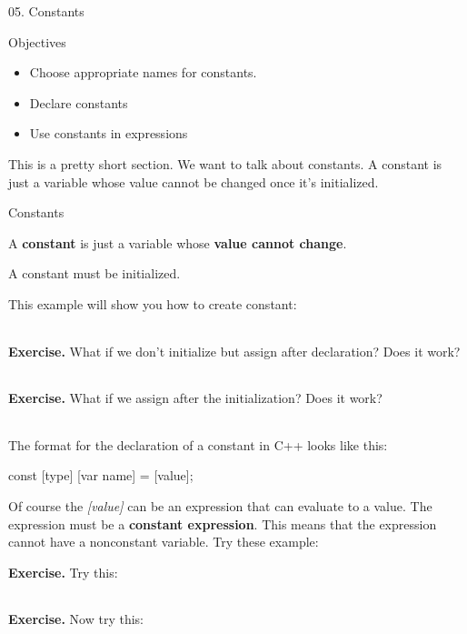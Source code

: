 \documentclass[
]{article}
\author{}
\date{}
\providecommand{\tightlist}{%
  \setlength{\itemsep}{0pt}\setlength{\parskip}{0pt}}
\begin{document}
05. Constants

Objectives

\begin{itemize}
\tightlist
\item
  Choose appropriate names for constants.
\item
  Declare constants
\item
  Use constants in expressions
\end{itemize}

This is a pretty short section. We want to talk about constants. A
constant is just a variable whose value cannot be changed once it's
initialized.

Constants

A \textbf{constant} is just a variable whose \textbf{value cannot
change}.

A constant must be initialized.

This example will show you how to create constant:

\begin{longtable}[]{@{}@{}}
\toprule
\endhead
\bottomrule
\end{longtable}

\textbf{Exercise.} What if we don't initialize but assign after
declaration? Does it work?

\begin{longtable}[]{@{}@{}}
\toprule
\endhead
\bottomrule
\end{longtable}

\textbf{Exercise.} What if we assign after the initialization? Does it
work?

\begin{longtable}[]{@{}@{}}
\toprule
\endhead
\bottomrule
\end{longtable}

The format for the declaration of a constant in C++ looks like this:

const {[}type{]} {[}var name{]} = {[}value{]};

Of course the \emph{{[}value{]}} can be an expression that can evaluate
to a value. The expression must be a \textbf{constant expression}. This
means that the expression cannot have a nonconstant variable. Try these
example:

\textbf{Exercise.} Try this:

\begin{longtable}[]{@{}@{}}
\toprule
\endhead
\bottomrule
\end{longtable}

\textbf{Exercise.} Now try this:
\end{document}
